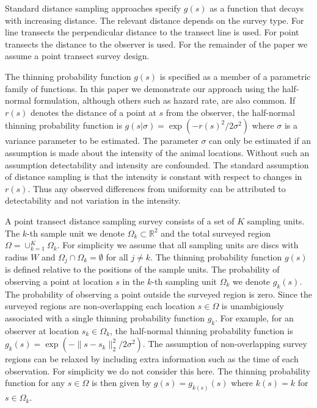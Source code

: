 \documentclass[preprint,12pt]{elsarticle}
\begin{document}
Standard distance sampling approaches specify $g(s)$ as a function that decays with increasing distance.  The relevant distance depends on the survey type.  For line transects the perpendicular distance to the transect line is used.  For point transects the distance to the observer is used.  For the remainder of the paper we assume a point transect survey design.  

The thinning probability function $g(s)$ is specified as a member of a parametric family of functions.  In this paper we demonstrate our approach using the half-normal formulation, although others such as hazard rate, are also common.  If $r(s)$ denotes the distance of a point at $s$ from the observer, the half-normal thinning probability function is $g(s | \sigma) = \exp(-r(s)^2 / 2\sigma^2)$ where $\sigma$ is a variance parameter to be estimated.  The parameter $\sigma$ can only be estimated if an assumption is made about the intensity of the animal locations.  Without such an assumption detectability and intensity are confounded.  The standard assumption of distance sampling is that the intensity is constant with respect to changes in $r(s)$.  Thus any observed differences from uniformity can be attributed to detectability and not variation in the intensity.

A point transect distance sampling survey consists of a set of $K$ sampling units.  The $k$-th sample unit we denote $\Omega_k \subset \mathbb{R}^2$ and the total surveyed region $\Omega = \cup_{k=1}^K \Omega_k$.  For simplicity we assume that all sampling units are discs with radius $W$ and $\Omega_j \cap \Omega_k = \emptyset$ for all $j \neq k$.  The thinning probability function $g(s)$ is defined relative to the positions of the sample units.  The probability of observing a point at location $s$ in the $k$-th sampling unit $\Omega_k$ we denote $g_k(s)$.  The probability of observing a point outside the surveyed region is zero.
Since the surveyed regions are non-overlapping each location $s \in \Omega$ is unambigiously associated with a single thinning probability function $g_k$.  For example, for an observer at location $s_k \in \Omega_k$, the half-normal thinning probability function is $g_k(s) = \exp(-\lVert s - s_k \rVert_2^2 / 2\sigma^2)$. The assumption of non-overlapping survey regions can be relaxed by including extra information such as the time of each observation.  For simplicity we do not consider this here.  The thinning probability function for any $s \in \Omega$ is then given by $g(s) = g_{k(s)}(s)$ where $k(s) = k$ for $s \in \Omega_k$.
\end{document}
